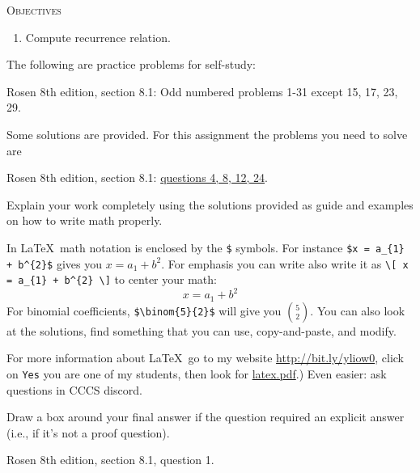 

\renewcommand\AUTHOR{nweadick1@cougars.ccis.edu} %


\topmattertwo

\textsc{Objectives}
\begin{enumerate}
\item Compute recurrence relation.
\end{enumerate}
\vspace{1cm}



The following are practice problems for self-study:
\begin{enumerate}[nosep]
\li Rosen 8th edition, section 8.1: Odd numbered problems 1-31 except 15, 17,
23, 29.
\end{enumerate}
Some solutions are provided.
For this assignment the problems you need to solve are
\begin{enumerate}[nosep]
\li Rosen 8th edition, section 8.1: \underline{questions 4, 8, 12, 24}.
\end{enumerate}
Explain your work completely using the solutions provided as
guide and examples on how to write math properly.

In \LaTeX\, math notation is enclosed by the \verb!$! symbols.
For instance \verb!$x = a_{1} + b^{2}$! gives you $x = a_{1} + b^{2}$.
For emphasis you can write also write it as
\verb!\[ x = a_{1} + b^{2} \]!
to center your math:
\[
x = a_{1} + b^{2}
\]
For binomial coefficients, \verb!$\binom{5}{2}$! will give you 
$\binom{5}{2}$.
You can also look at the solutions, find something that you can use,
copy-and-paste, and modify.

For more information about \LaTeX\, go to my
website
\href{http://bit.ly/yliow0}{http://bit.ly/yliow0},
click on \verb!Yes!
you are one of my students,
then look for
\href{https://drive.google.com/file/d/0BzjYrK0VFuMWZm5xV0kyR3J2Zm8/view?usp=sharing}{latex.pdf}.)
Even easier: ask questions in CCCS discord.





Draw a box around your final answer if the question required
an explicit answer (i.e., if it's not a proof question).

\newpage
\nextq Rosen 8th edition, section 8.1, question 1.

\SOLUTION



